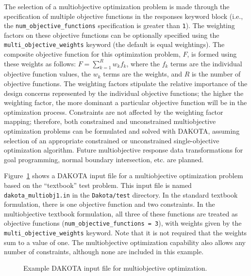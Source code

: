 The selection of a multiobjective optimization problem is made through
the specification of multiple objective functions in the responses
keyword block (i.e., the \texttt{num\_objective\_functions}
specification is greater than \texttt{1}). The weighting factors on
these objective functions can be optionally specified using the
\texttt{multi\_objective\_weights} keyword (the default is equal
weightings). The composite objective function for this optimization
problem, $F$, is formed using these weights as follows:
$F=\sum_{k=1}^{R}w_{k}f_{k}$, where the $f_{k}$ terms are the
individual objective function values, the $w_{k}$ terms are the
weights, and $R$ is the number of objective functions. The weighting
factors stipulate the relative importance of the design concerns
represented by the individual objective functions; the higher the
weighting factor, the more dominant a particular objective function
will be in the optimization process.  Constraints are not affected by
the weighting factor mapping; therefore, both constrained and
unconstrained multiobjective optimization problems can be formulated
and solved with DAKOTA, assuming selection of an appropriate
constrained or unconstrained single-objective optimization algorithm.
Future multiobjective response data transformations for goal
programming, normal boundary intersection, etc. are planned.

Figure~\ref{opt:figure01} shows a DAKOTA input file for a
multiobjective optimization problem based on the ``textbook'' test
problem. This input file is named \texttt{dakota\_multiobj1.in} in the
\texttt{Dakota/test} directory. In the standard textbook formulation,
there is one objective function and two constraints. In the
multiobjective textbook formulation, all three of these functions are
treated as objective functions (\texttt{num\_objective\_functions =
  3}), with weights given by the \texttt{multi\_objective\_weights}
keyword.  Note that it is not required that the weights sum to a value
of one.  The multiobjective optimization capability also allows any
number of constraints, although none are included in this example.

\begin{figure}
\centering
\begin{bigbox}
\begin{small}
\end{small}
\end{bigbox}
\caption{Example DAKOTA input file for multiobjective optimization.}
\label{opt:figure01}
\end{figure}

